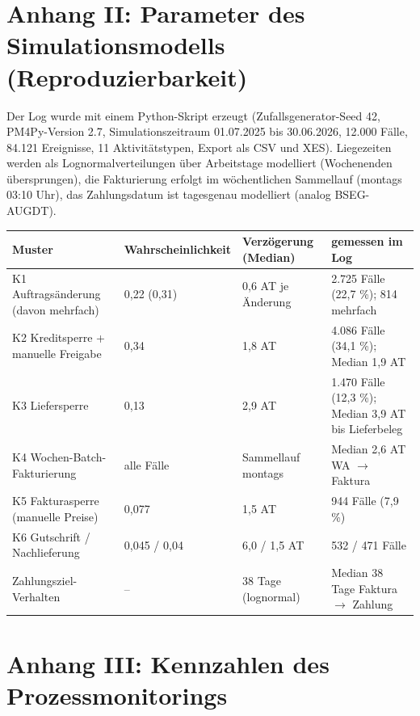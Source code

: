 \label{anh:parameter}
\section*{Anhang II: Parameter des Simulationsmodells (Reproduzierbarkeit)}

Der Log wurde mit einem Python-Skript erzeugt (Zufallsgenerator-Seed 42, PM4Py-Version 2.7, Simulationszeitraum 01.07.2025 bis 30.06.2026, 12.000 Fälle, 84.121 Ereignisse, 11 Aktivitätstypen, Export als CSV und XES). Liegezeiten werden als Lognormalverteilungen über Arbeitstage modelliert (Wochenenden übersprungen), die Fakturierung erfolgt im wöchentlichen Sammellauf (montags 03:10 Uhr), das Zahlungsdatum ist tagesgenau modelliert (analog BSEG-AUGDT).

\begin{table}[!htb]
\centering
\small
\begin{tabularx}{\textwidth}{@{}Y l l Y@{}}
\toprule
\textbf{Muster} & \textbf{Wahrscheinlichkeit} & \textbf{Verzögerung (Median)} & \textbf{gemessen im Log} \\
\midrule
K1 Auftragsänderung (davon mehrfach) & 0,22 (0,31) & 0,6 AT je Änderung & 2.725 Fälle (22,7 \%); 814 mehrfach \\
K2 Kreditsperre + manuelle Freigabe & 0,34 & 1,8 AT & 4.086 Fälle (34,1 \%); Median 1,9 AT \\
K3 Liefersperre & 0,13 & 2,9 AT & 1.470 Fälle (12,3 \%); Median 3,9 AT bis Lieferbeleg \\
K4 Wochen-Batch-Fakturierung & alle Fälle & Sammellauf montags & Median 2,6 AT WA $\rightarrow$ Faktura \\
K5 Fakturasperre (manuelle Preise) & 0,077 & 1,5 AT & 944 Fälle (7,9 \%) \\
K6 Gutschrift /\allowbreak{} Nachlieferung & 0,045 /\allowbreak{} 0,04 & 6,0 /\allowbreak{} 1,5 AT & 532 /\allowbreak{} 471 Fälle \\
Zahlungsziel-Verhalten & -- & 38 Tage (lognormal) & Median 38 Tage Faktura $\rightarrow$ Zahlung \\
\bottomrule
\end{tabularx}
\end{table}


\label{anh:kennzahlen}
\section*{Anhang III: Kennzahlen des Prozessmonitorings}

